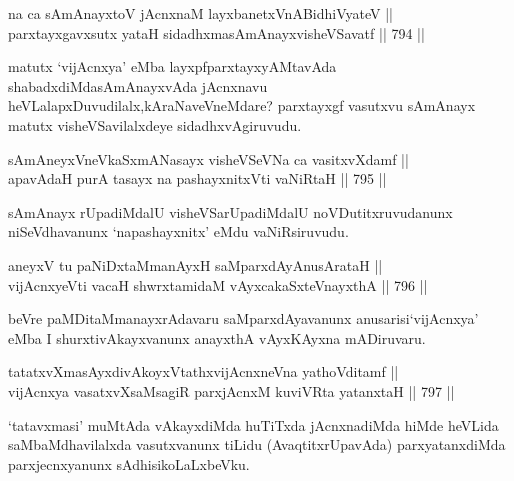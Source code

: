 
\begin{shl}
na ca sAmAnayxtoV jAcnxnaM layxbanetxVnABidhiVyateV || \\
parxtayxgavxsutx yataH sidadhxmasAmAnayxvisheVSavatf \hfill || 794 ||  
\end{shl}

\begin{artha}
matutx `vijAcnxya' eMba layxpfparxtayxyAMtavAda shabadxdiMda\break sAmAnayxvAda jAcnxnavu heVLalapxDuvudilalx,kAraNaveVneMdare? parxtayxgf vasutxvu sAmAnayx matutx visheVSavilalxdeye sidadhxvAgiruvudu.
\end{artha}


\begin{shl}
sAmAneyxVneVkaSxmANasayx visheVSeVNa ca vasitxvXdamf || \\
apavAdaH purA tasayx na pashayxnitxVti vaNiRtaH \hfill || 795 ||  
\end{shl}

\begin{artha}
sAmAnayx rUpadiMdalU visheVSarUpadiMdalU noVDutitxruvudanunx niSeVdhavanunx `napashayxnitx' eMdu vaNiRsiruvudu.
\end{artha}


\begin{shl}
aneyxV tu paNiDxtaMmanAyxH saMparxdAyAnusArataH || \\
vijAcnxyeVti vacaH shwrxtamidaM vAyxcakaSxteV\s nayxthA \hfill || 796 ||  
\end{shl}

\begin{artha}
beVre paMDitaMmanayxrAdavaru saMparxdAyavanunx anusarisi\break `vijAcnxya' eMba I shurxtivAkayxvanunx anayxthA vAyxKAyxna mADiruvaru.
\end{artha}


\begin{shl}
tatatxvXmasAyxdivAkoyxVtathxvijAcnxneVna yathoVditamf || \\
vijAcnxya vasatxvXsaMsagiR parxjAcnxM kuviVRta yatanxtaH \hfill || 797 ||  
\end{shl}

\begin{artha}
`tatavxmasi' muMtAda vAkayxdiMda huTiTxda jAcnxnadiMda hiMde heVLida saMbaMdhavilalxda vasutxvanunx tiLidu (AvaqtitxrUpavAda) parxyatanxdiMda parxjecnxyanunx sAdhisikoLaLxbeVku.
\end{artha}

